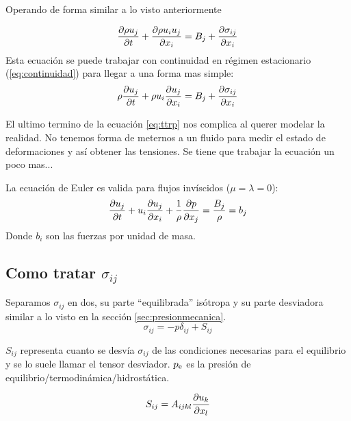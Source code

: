 Operando de forma similar a lo visto anteriormente

\begin{equation} \label{eq:ttrpTransitorio}
\frac{\partial \rho u_j}{\partial t}+\frac{\partial \rho u_i u_j}{\partial x_i}=B_j+\frac{\partial \sigma_{ij}}{\partial x_i}
\end{equation}
Esta ecuación se puede trabajar con continuidad en régimen estacionario (\ref{eq:continuidad}) para llegar a una forma mas simple:
\begin{equation} \label{eq:ttrp}
    \rho \frac{\partial u_j}{\partial t} +\rho u_i \frac{\partial u_j}{\partial x_i}=B_j+\frac{\partial \sigma_{ij}}{\partial x_i}
\end{equation}

El ultimo termino de la ecuación \ref{eq:ttrp} nos complica al querer modelar la realidad. No tenemos forma de meternos a un fluido para medir el estado de deformaciones y así obtener las tensiones. Se tiene que trabajar la ecuación un poco mas...
\begin{mdframed}
La ecuación de Euler es valida para flujos invíscidos ($\mu=\lambda=0$):
\begin{equation} \label{eq:eulerDiff}
    \frac{\partial u_j}{\partial t}+u_i\frac{\partial u_j}{\partial x_i}+\frac{1}{\rho}\frac{\partial p}{\partial x_j}=\frac{B_j}{\rho}=b_j
\end{equation}
Donde $b_i$ son las fuerzas por unidad de masa.
\end{mdframed}
\subsection[Como reescribir los esfuerzos]{Como tratar $\sigma_{ij}$}
Separamos $\sigma_{ij}$ en dos, su parte ``equilibrada'' isótropa y su parte desviadora similar a lo visto en la sección \ref{sec:presionmecanica}. 
\begin{equation}\label{eq:sigma1}
\sigma_{ij}=-p \delta_{ij} +S_{ij}
\end{equation}


$S_{ij}$ representa cuanto se desvía $\sigma_{ij}$ de las condiciones necesarias para el equilibrio y se lo suele llamar el tensor desviador. $\pe$ es la presión de equilibrio/termodinámica/hidrostática.

\[S_{ij}=A_{ijkl}\frac{\partial u_k}{\partial x_l} \]

